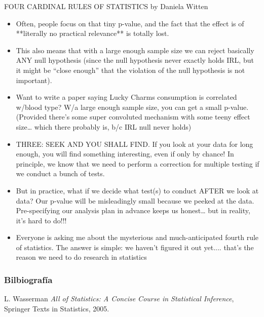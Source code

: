 \documentclass[handout]{beamer}
\begin{document}
\begin{frame}{FOUR CARDINAL RULES OF STATISTICS by Daniela Witten}
\scriptsize{
\begin{itemize}
 \item Often, people focus on that tiny p-value, and the fact that the effect is of **literally no practical relevance** is totally lost.
 \item This also means that with a large enough sample size we can reject basically ANY null hypothesis (since the null hypothesis never exactly holds IRL, but it might be “close enough” that the violation of the null hypothesis is not important). 
 \item Want to write a paper saying Lucky Charms consumption is correlated w/blood type? W/a large enough sample size, you can get a small p-value.  (Provided there’s some super convoluted mechanism with some teeny effect size… which there probably is, b/c IRL null never holds)
\item THREE:  SEEK AND YOU SHALL FIND. If you look at your data for long enough, you will find something interesting, even if only by chance! 
In principle, we know that we need to perform a correction for multiple testing if we conduct a bunch of tests.
\item But in practice, what if we decide what test(s) to conduct AFTER we look at data?  Our p-value will be misleadingly small because we peeked at the data.  Pre-specifying our analysis plan in advance keeps us honest… but in reality, it’s hard to do!!!
\item Everyone is asking me about the mysterious and much-anticipated fourth rule of statistics. The answer is simple: we haven’t figured it out yet.... that’s the reason we need to do research in statistics
\end{itemize}

} 
\end{frame}



\begin{frame}[allowframebreaks]\scriptsize
\frametitle{Bilbiografía}
\begin{thebibliography}{8}

L. Wasserman \emph{All of Statistics: A Concise Course in Statistical Inference}, Springer Texts in Statistics, 2005.
\end{thebibliography}


\end{frame}




\end{document}
